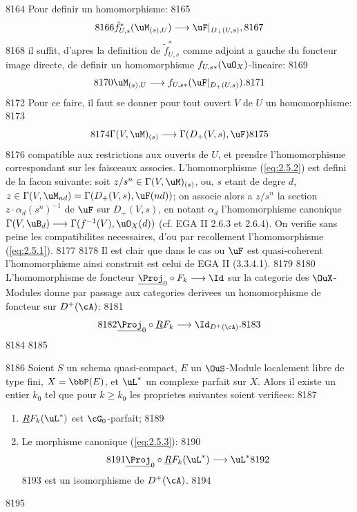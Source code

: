   8164	Pour definir un homomorphisme:
  8165	\[
  8166	\tilde{f}_{U,s}^*(\uM_{(s),U}) \longrightarrow \uF|_{D_+(U,s)},
  8167	\]
  8168	il suffit, d'apres la definition de $\tilde{f}_{U,s}^*$ comme adjoint a gauche du foncteur image directe, de definir un homomorphisme $f_{U,s*}(\uO_X)$-lineaire:
  8169	\[
  8170	\uM_{(s),U} \longrightarrow f_{U,s*}(\uF|_{D_+(U,s)}).
  8171	\]
  8172	Pour ce faire, il faut se donner pour tout ouvert $V$ de $U$ un homomorphisme:
  8173	\begin{equation}\label{eq:2.5.2}
  8174	\Gamma(V, \uM)_{(s)} \longrightarrow \Gamma(D_+(V,s), \uF)
  8175	\end{equation}
  8176	compatible aux restrictions aux ouverts de $U$, et prendre l'homomorphisme correspondant sur les faisceaux associes. L'homomorphisme (\ref{eq:2.5.2}) est defini de la facon suivante: soit $z/s^n \in \Gamma(V, \uM)_{(s)}$, ou, $s$ etant de degre $d$, $z \in \Gamma(V, \uM_{nd}) = \Gamma(D_+(V,s), \uF(nd))$; on associe alors a $z/s^n$ la section $z \cdot \alpha_d(s^n)^{-1}$ de $\uF$ sur $D_+(V,s)$, en notant $\alpha_d$ l'homomorphisme canonique $\Gamma(V, \uB_d) \longrightarrow \Gamma(f^{-1}(V), \uO_X(d))$ (cf. EGA II 2.6.3 et 2.6.4). On verifie sans peine les compatibilites necessaires, d'ou par recollement l'homomorphisme (\ref{eq:2.5.1}).
  8177	
  8178	Il est clair que dans le cas ou $\uF$ est quasi-coherent l'homomorphisme ainsi construit est celui de EGA II (3.3.4.1).
  8179	
  8180	L'homomorphisme de foncteur $\underline{\Proj}_0 \circ F_k \longrightarrow \Id$ sur la categorie des $\OuX$-Modules donne par passage aux categories derivees un homomorphisme de foncteur sur $D^+(\cA)$:
  8181	\begin{equation}\label{eq:2.5.3}
  8182	\underline{\Proj}_0 \circ \underline{R}F_k \longrightarrow \Id_{D^+(\cA)}.
  8183	\end{equation}
  8184	
  8185	\begin{prop}
  8186	Soient $S$ un schema quasi-compact, $E$ un $\OuS$-Module localement libre de type fini, $X = \bbP(E)$, et $\uL^*$ un complexe parfait sur $X$. Alors il existe un entier $k_0$ tel que pour $k \geqslant k_0$ les proprietes suivantes soient verifiees:
  8187	\begin{enumerate}[label=\roman*)]
  8188	\item $\underline{R}F_k(\uL^*)$ est $\cG_0$-parfait;
  8189	\item Le morphisme canonique (\ref{eq:2.5.3}):
  8190	\[
  8191	\underline{\Proj}_0 \circ \underline{R}F_k(\uL^*) \longrightarrow \uL^*
  8192	\]
  8193	est un isomorphisme de $D^+(\cA)$.
  8194	\end{enumerate}
  8195	\end{prop}
